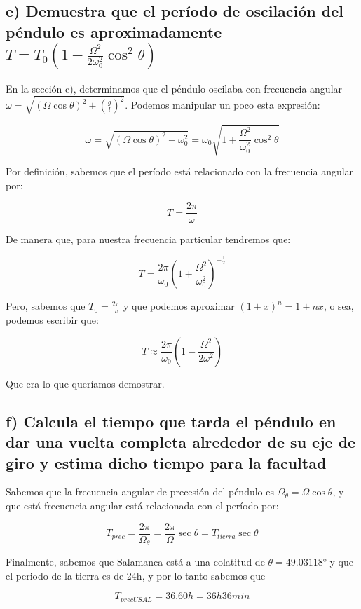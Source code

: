 \documentclass[a4paper,12pt]{article}
\begin{document}
\subsection*{e) Demuestra que el período de oscilación del péndulo es aproximadamente $T = T_{0}(1-\frac{\Omega^2}{2\omega^2_0}\cos^2\theta) $}

En la sección c), determinamos que el péndulo oscilaba con frecuencia angular $\omega = \sqrt{(\Omega\cos\theta)^2 + \left(\frac{g}{l}\right)^2}$. Podemos manipular un poco esta expresión:

$$\omega =\sqrt{(\Omega\cos\theta)^2 + \omega_0^2} = \omega_0 \sqrt{1 + \frac{\Omega^2}{\omega_0^2} \cos^2\theta} $$

Por definición, sabemos que el período está relacionado con la frecuencia angular por:

$$T = \frac{2\pi}{ \omega}$$

De manera que, para nuestra frecuencia particular tendremos que:

$$T = \frac{2\pi}{\omega_0} \left(1 + \frac{\Omega^2}{\omega_0^2}\right)^{-\frac{1}{2}}$$

Pero, sabemos que $T_{0} =\frac{2\pi}{\omega} $ y que podemos aproximar $(1+x)^{n} =1+nx$, o sea, podemos escribir que:

\begin{equation}
  T \approx \frac{2\pi}{\omega_0} \left(1 - \frac{\Omega^2}{2\omega^2}\right)
\end{equation}

Que era lo que queríamos demostrar.

\subsection*{f) Calcula el tiempo que tarda el péndulo en dar una vuelta completa alrededor de su eje de giro y estima dicho tiempo para la facultad}

Sabemos que la frecuencia angular de precesión del péndulo es $\Omega_{\theta} = \Omega \cos\theta$, y que está frecuencia angular está relacionada con el período por:

$$T_{prec} = \frac{2\pi}{\Omega_\theta} = \frac{2\pi}{\Omega} \sec\theta = T_{tierra} \sec\theta $$

Finalmente, sabemos que Salamanca está a una colatitud de $\theta = 49.03118°$ y que el periodo de la tierra es de 24h, y por lo tanto sabemos que

$$T_{precUSAL} = 36.60 h = 36h 36 min$$
\end{document}
